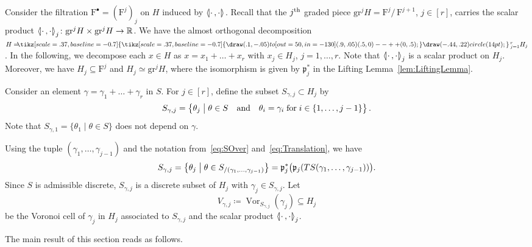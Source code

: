 \documentclass[AHL,Unicode,longabstracts]{cedram}
\makeatletter
\newcommand{\symbuptm}{\tikz[scale=.37, baseline=-0.7]{\draw(.1,-.05)to[out=50,in=-130](.9,.05) (.5,0)--++(0,.5);}}
\newcommand{\almorth}{\tikz[scale=.37, baseline=-0.7]{\symbuptm \draw (-.44,.22) circle (14pt);}}
\newcommand{\aplus}{\hspace{-.2cm}\almorth\,}
\newcommand{\llangle}{\mathopen{\langle\mkern -3.1mu\lvert}}
\newcommand{\rrangle}{\mathclose{\rvert\mkern -3.1mu\rangle}}
\newcommand{\highinn}[2]{{\llangle#2\rrangle_{#1}}}
\newcommand{\rquot}[2]{#1/\,#2}
\newcommand{\st}{\bigm|}
\DeclareMathOperator{\Vor}{Vor}
\newcommand{\filter}{\mathrm{F}}
\newcommand{\R}{\mathbb{R}}
\newcommand{\grm}[2]{\mathrm{gr}_{#1}^{#2}}
\newcommand{\proj}{\mathfrak{p}}
\renewcommand*{\to}{\mathchoice{\longrightarrow}{\rightarrow}{\rightarrow}{\rightarrow}}
\let\save@mathaccent\mathaccent
\newcommand*\if@single[3]{%
  \setbox0\hbox{${\mathaccent"0362{#1}}^H$}%
  \setbox2\hbox{${\mathaccent"0362{\kern0pt#1}}^H$}%
  \ifdim\ht0=\ht2 #3\else #2\fi
  }
\newcommand*\rel@kern[1]{\kern#1\dimexpr\macc@kerna}
\newcommand*\widebar[1]{\@ifnextchar^{{\wide@bar{#1}{0}}}{\wide@bar{#1}{1}}}
\newcommand*\wide@bar[2]{\if@single{#1}{\wide@bar@{#1}{#2}{1}}{\wide@bar@{#1}{#2}{2}}}
\newcommand*\wide@bar@[3]{%
  \begingroup
  \def\mathaccent##1##2{%
    \let\mathaccent\save@mathaccent
    \if#32 \let\macc@nucleus\first@char \fi
    \setbox\z@\hbox{$\macc@style{\macc@nucleus}_{}$}%
    \setbox\tw@\hbox{$\macc@style{\macc@nucleus}{}_{}$}%
    \dimen@\wd\tw@
    \advance\dimen@-\wd\z@
    \divide\dimen@ 3
    \@tempdima\wd\tw@
    \advance\@tempdima-\scriptspace
    \divide\@tempdima 10
    \advance\dimen@-\@tempdima
    \ifdim\dimen@>\z@ \dimen@0pt\fi
    \rel@kern{0.6}\kern-\dimen@
    \if#31
      \overline{\rel@kern{-0.6}\kern\dimen@\macc@nucleus\rel@kern{0.4}\kern\dimen@}%
      \advance\dimen@0.4\dimexpr\macc@kerna
      \let\final@kern#2%
      \ifdim\dimen@<\z@ \let\final@kern1\fi
      \if\final@kern1 \kern-\dimen@\fi
    \else
      \overline{\rel@kern{-0.6}\kern\dimen@#1}%
    \fi
  }%
  \macc@depth\@ne
  \let\math@bgroup\@empty \let\math@egroup\macc@set@skewchar
  \mathsurround\z@ \frozen@everymath{\mathgroup\macc@group\relax}%
  \macc@set@skewchar\relax
  \let\mathaccentV\macc@nested@a
  \if#31
    \macc@nested@a\relax111{#1}%
  \else
    \def\gobble@till@marker##1\endmarker{}%
    \futurelet\first@char\gobble@till@marker#1\endmarker
    \ifcat\noexpand\first@char A\else
      \def\first@char{}%
    \fi
    \macc@nested@a\relax111{\first@char}%
  \fi
  \endgroup
}
\let\oldbar\bar
\renewcommand*{\bar}[1]{{\mathchoice{\widebar{#1}}{\widebar{#1}}{\widebar{#1}}{\oldbar{#1}}}}
\makeatother
\begin{document}
Consider the filtration $\filter^\bullet = (\filter^j)_{j}$ on $H$ induced by $\highinn{}{\cdot\,,\cdot}$. Recall that the $j^{\rm th}$ graded piece $\grm{}{j}H = \rquot{\filter^j}{\filter^{j+1}}$, $j \in [r]$, carries the scalar product $\highinn{j}{\cdot\,,\cdot} \colon \grm{}{j}H \times \grm{}{j}H \to \R$. We have the almost orthogonal decomposition $H = \aplus_{j=1}^r H_j$. In the following, we decompose each $x \in H$ as $x = x_1 + \dots +x_r$ with $x_j \in H_j$, $j=1, \dots, r$. Note that $\highinn{j}{\cdot\,,\cdot}$ is a scalar product on $H_j$. Moreover, we have $H_j \subseteq \filter^j$ and $H_j \simeq \grm{}{j}H$, where the isomorphism is given by $\proj_j^*$ in the Lifting Lemma~\ref{lem:LiftingLemma}.

Consider an element $\gamma =\gamma_1 + \dots + \gamma_r$ in $S$. For $j \in [r]$, define the subset $S_{\gamma, j} \subset H_j$ by
\[
S_{\gamma, j} = \left\{ \theta_j \bigm| \theta \in S \quad\text{and}\quad \theta_i = \gamma_i \;\text{for}\; i \in\{1, \dots, j-1\} \right\}.
\]
Note that $S_{\gamma, 1} = \{\theta_1 \mid \theta \in S\}$ does not depend on $\gamma$.

Using the tuple $(\gamma_1, \dots, \gamma_{j-1})$ and the notation from~\eqref{eq:SOver} and~\eqref{eq:Translation}, we have
\[
S_{\gamma, j} = \left\{ \theta_j \st \theta \in S_{/(\gamma_1, \dots, \gamma_{j-1})} \right\} = \proj_j^\ast\bigl(\proj_j(TS(\gamma_1, \dots, \gamma_{j-1}))\bigr).
\]
Since $S$ is admissible discrete, $S_{\gamma,j}$ is a discrete subset of $H_j$ with $\gamma_j \in S_{\gamma,j}$. Let
\[
V_{\gamma, j} \coloneqq \Vor_{S_{\gamma,j}}(\gamma_j) \subseteq H_j
\]
be the Voronoi cell of $\gamma_j$ in $H_j$ associated to $S_{\gamma,j}$ and the scalar product $\highinn{j}{\cdot\,,\cdot}$.



The main result of this section reads as follows.

\end{document}
